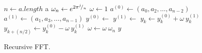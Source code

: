 \begin{algorithm}
  \begin{algorithmic}[1]
      \State $n \gets a.length$
        \State \Return a
      \EndIf
      \State $\omega_n \gets e^{2 \pi {}^{j}\!/_{n}}$
      \State $\omega \gets 1$
      \State $a^{(0)} \gets (a_0, a_2, \dotsc, a_{n - 2})$
      \State $a^{(1)} \gets (a_1, a_3, \dotsc, a_{n - 1})$
      \State $y^{(0)} \gets $
      \State $y^{(1)} \gets $
        \State $y_k \gets y_k^{(0)} + \omega\ y_k^{(1)}$
        \State $y_{k + (n/2)} \gets y_k^{(0)} - \omega\ y_k^{(1)}$
        \State $\omega \gets \omega\ \omega_n$
      \EndFor
      \State \Return $y$
    \EndFunction
  \end{algorithmic}
  \caption{Recursive FFT.}
  \label{alg:rec-fft}
\end{algorithm}
